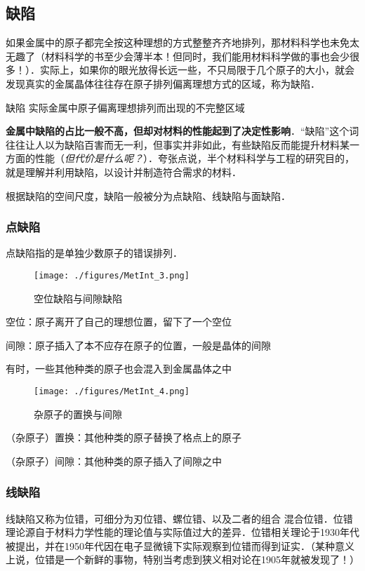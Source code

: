 \subsection{缺陷}
如果金属中的原子都完全按这种理想的方式整整齐齐地排列，那材料科学也未免太无趣了（材料科学的书至少会薄半本！但同时，我们能用材料科学做的事也会少很多！）．实际上，如果你的眼光放得长远一些，不只局限于几个原子的大小，就会发现真实的金属晶体往往存在原子排列偏离理想方式的区域，称为缺陷．

\begin{definition}{缺陷}
实际金属中原子偏离理想排列而出现的不完整区域
\end{definition}

\textbf{金属中缺陷的占比一般不高，但却对材料的性能起到了决定性影响}．“缺陷”这个词往往让人以为缺陷百害而无一利，但事实并非如此，有些缺陷反而能提升材料某一方面的性能（\textsl{但代价是什么呢？}）．夸张点说，半个材料科学与工程的研究目的，就是理解并利用缺陷，以设计并制造符合需求的材料．

根据缺陷的空间尺度，缺陷一般被分为点缺陷、线缺陷与面缺陷．

\subsubsection{点缺陷}
点缺陷指的是单独少数原子的错误排列．
\begin{figure}[ht]
\centering
\texttt{[image: ./figures/MetInt\_3.png]}
\caption{空位缺陷与间隙缺陷} \label{MetInt_fig3}
\end{figure}
空位：原子离开了自己的理想位置，留下了一个空位

间隙：原子插入了本不应存在原子的位置，一般是晶体的间隙

有时，一些其他种类的原子也会混入到金属晶体之中
\begin{figure}[ht]
\centering
\texttt{[image: ./figures/MetInt\_4.png]}
\caption{杂原子的置换与间隙} \label{MetInt_fig4}
\end{figure}

（杂原子）置换：其他种类的原子替换了格点上的原子

（杂原子）间隙：其他种类的原子插入了间隙之中

\subsubsection{线缺陷}
线缺陷又称为位错，可细分为刃位错、螺位错、以及二者的组合 混合位错．位错理论源自于材料力学性能的理论值与实际值过大的差异．位错相关理论于1930年代被提出，并在1950年代因在电子显微镜下实际观察到位错而得到证实．（某种意义上说，位错是一个新鲜的事物，特别当考虑到狭义相对论在1905年就被发现了！）

